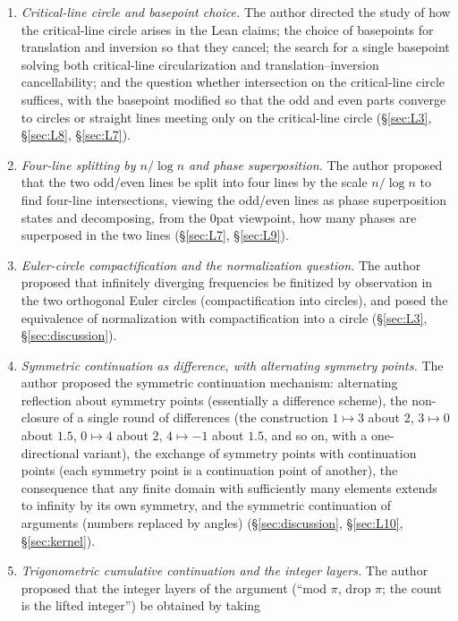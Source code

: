 \documentclass{article}
\begin{document}
\begin{enumerate}
\item \emph{Critical-line circle and basepoint choice.} The author directed
the study of how the critical-line circle arises in the Lean claims; the
choice of basepoints for translation and inversion so that they cancel; the
search for a single basepoint solving both critical-line circularization and
translation--inversion cancellability; and the question whether intersection
on the critical-line circle suffices, with the basepoint modified so that
the odd and even parts converge to circles or straight lines meeting only on
the critical-line circle (\S\ref{sec:L3}, \S\ref{sec:L8},
\S\ref{sec:L7}).
\item \emph{Four-line splitting by $n/\log n$ and phase superposition.} The
author proposed that the two odd/even lines be split into four lines by the
scale $n/\log n$ to find four-line intersections, viewing the odd/even lines
as phase superposition states and decomposing, from the 0pat viewpoint, how
many phases are superposed in the two lines (\S\ref{sec:L7},
\S\ref{sec:L9}).
\item \emph{Euler-circle compactification and the normalization question.}
The author proposed that infinitely diverging frequencies be finitized by
observation in the two orthogonal Euler circles (compactification into
circles), and posed the equivalence of normalization with compactification
into a circle (\S\ref{sec:L3}, \S\ref{sec:discussion}).
\item \emph{Symmetric continuation as difference, with alternating symmetry
points.} The author proposed the symmetric continuation mechanism:
alternating reflection about symmetry points (essentially a difference
scheme), the non-closure of a single round of differences (the construction
$1\mapsto3$ about $2$, $3\mapsto0$ about $1.5$, $0\mapsto4$ about $2$,
$4\mapsto-1$ about $1.5$, and so on, with a one-directional variant), the
exchange of symmetry points with continuation points (each symmetry point is
a continuation point of another), the consequence that any finite domain
with sufficiently many elements extends to infinity by its own symmetry, and
the symmetric continuation of arguments (numbers replaced by angles)
(\S\ref{sec:discussion}, \S\ref{sec:L10}, \S\ref{sec:kernel}).
\item \emph{Trigonometric cumulative continuation and the integer layers.}
The author proposed that the integer layers of the argument (``mod $\pi$,
drop $\pi$; the count is the lifted integer'') be obtained by taking

\end{enumerate}
\end{document}
